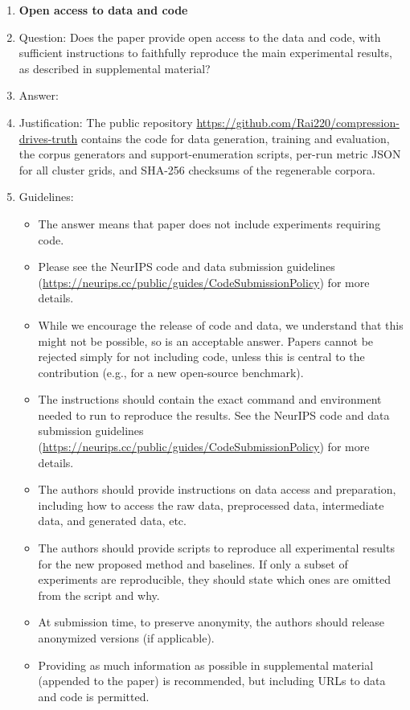 \documentclass{article}
\begin{document}
\begin{enumerate}
\item {\bf Open access to data and code}
    \item[] Question: Does the paper provide open access to the data and code, with sufficient instructions to faithfully reproduce the main experimental results, as described in supplemental material?
    \item[] Answer: \answerYes{}
    \item[] Justification: The public repository \url{https://github.com/Rai220/compression-drives-truth} contains the code for data generation, training and evaluation, the corpus generators and support-enumeration scripts, per-run metric JSON for all cluster grids, and SHA-256 checksums of the regenerable corpora.
    \item[] Guidelines:
    \begin{itemize}
        \item The answer \answerNA{} means that paper does not include experiments requiring code.
        \item Please see the NeurIPS code and data submission guidelines (\url{https://neurips.cc/public/guides/CodeSubmissionPolicy}) for more details.
        \item While we encourage the release of code and data, we understand that this might not be possible, so \answerNo{} is an acceptable answer. Papers cannot be rejected simply for not including code, unless this is central to the contribution (e.g., for a new open-source benchmark).
        \item The instructions should contain the exact command and environment needed to run to reproduce the results. See the NeurIPS code and data submission guidelines (\url{https://neurips.cc/public/guides/CodeSubmissionPolicy}) for more details.
        \item The authors should provide instructions on data access and preparation, including how to access the raw data, preprocessed data, intermediate data, and generated data, etc.
        \item The authors should provide scripts to reproduce all experimental results for the new proposed method and baselines. If only a subset of experiments are reproducible, they should state which ones are omitted from the script and why.
        \item At submission time, to preserve anonymity, the authors should release anonymized versions (if applicable).
        \item Providing as much information as possible in supplemental material (appended to the paper) is recommended, but including URLs to data and code is permitted.
    \end{itemize}



\end{enumerate}
\end{document}
